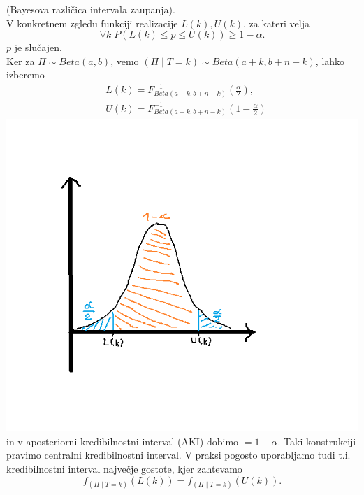 \documentclass[a4paper, 12pt]{book}
\theoremstyle{definition}
\theoremstyle{remark}
\begin{document}
(Bayesova različica intervala zaupanja). \\
V konkretnem zgledu  funkciji realizacije $L(k), U(k)$, za kateri velja
\begin{equation*}
  \forall k \; P\left(L(k) \leq p \leq U(k)\right) \geq 1-\alpha.
\end{equation*}
$p$ je slučajen. \\
Ker za $\Pi \sim Beta(a,b)$, vemo $(\Pi \mid T=k) \sim Beta(a+k, b+n-k)$, lahko izberemo
\begin{align*}
  &L(k) = F_{Beta(a+k,b+n-k)}^{-1}\left(\frac{\alpha}{2}\right), \\
  &U(k) = F_{Beta(a+k,b+n-k)}^{-1}\left(1 - \frac{\alpha}{2}\right)
\end{align*}
\includegraphics[scale=0.5]{interval_kvantili_1_5} \\
in v aposteriorni kredibilnostni interval (AKI) dobimo $= 1 - \alpha$.
Taki konstrukciji pravimo centralni kredibilnostni interval.
V praksi pogosto uporabljamo tudi t.i. kredibilnostni interval največje gostote, kjer zahtevamo
\begin{equation*}
  f_{(\Pi \mid T=k)}(L(k)) = f_{(\Pi \mid T=k)}(U(k)).
\end{equation*}
\end{document}
